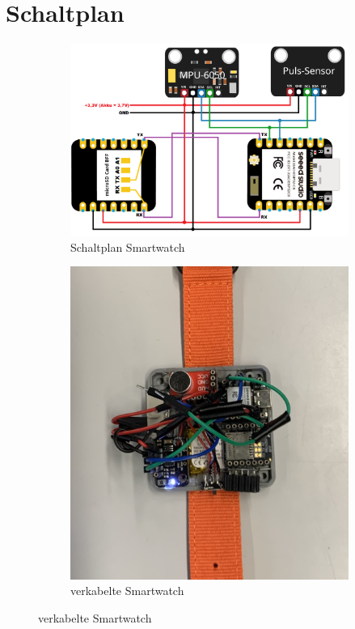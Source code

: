 \documentclass[a4paper, 11pt]{article}
\begin{document}
\clearpage

\section{Schaltplan}
\begin{figure}[H]
    \centering
    \begin{subfigure}{0.64\textwidth}
        \centering
        \includegraphics[width=\textwidth]{images/Schaltplan_v1.png}
        \caption{Schaltplan Smartwatch}
        \label{fig:Schaltplan Smartwatch}
    \end{subfigure}
    \begin{subfigure}{0.34\textwidth}
        \centering
        \includegraphics[width=\textwidth]{images/verkabelte_Smartwatch_cropped.JPEG}
        \caption{verkabelte Smartwatch}
        \label{fig:verkabelte Smartwatch}
    \end{subfigure}
\end{figure}
\end{document}
